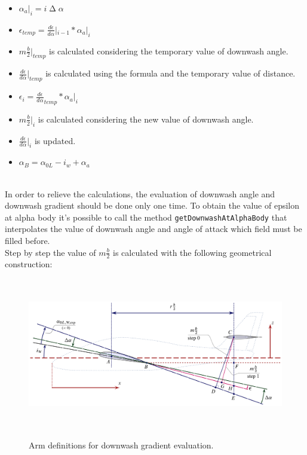 \begin{enumerate}
\begin{itemize}
\item $\alpha_a|_i = i \upDelta \alpha$ 
\item $\epsilon_{temp}= \frac{d\epsilon}{d\alpha} |_{i-1} *  \alpha_a |_i $%
\item  $m  \frac{b}{2}| _{temp} $  is calculated considering the temporary value of downwash angle.
\item $\frac{d\epsilon}{d\alpha}|_{temp}$  is calculated using the formula and the temporary value of distance.
\item $\epsilon_{i}=  \frac{d\epsilon}{d\alpha}_{temp} *  \alpha_a |_i $ 
\item  $m  \frac{b}{2}| _{i} $  is calculated considering the new value of downwash angle.
\item $\frac{d\epsilon}{d\alpha}|_{i}$  is updated.
\item $\alpha_B =\alpha_{0L} - i_w + \alpha_a $ 
\end{itemize}

\end{enumerate}

\noindent \\
In order to relieve the calculations, the evaluation of downwash angle and downwash gradient should be done only one time. To obtain the value of epsilon at alpha body it's possible to call the method  \texttt{getDownwashAtAlphaBody} that interpolates the value of downwash angle and angle of attack which field must be filled before.\\ 


Step by step the value of $m  \frac{b}{2}$ is calculated with the following geometrical construction: 
\noindent \\

\begin{figure}[H]
\centering
{\includegraphics[height=6.63cm]{Immagini/arms_definitions.pdf}} 
\caption{Arm definitions for downwash gradient evaluation.}
\label{flowchartangles}
\end{figure} 

